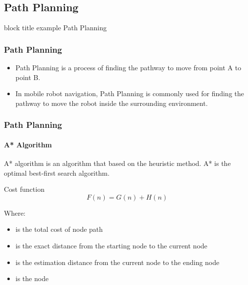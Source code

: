 \begin{frame}
	\subsection{Path Planning}
	\begin{beamercolorbox}[rounded=true]{block title example}
		\centering
		\LARGE
		Path Planning
	\end{beamercolorbox}
\end{frame}



\begin{frame}
	\frametitle{Path Planning}
	\begin{itemize}
		\item<1-> Path Planning is a process of finding the pathway to move from point A to point B.
		\item<2-> In mobile robot navigation, Path Planning is commonly used for finding the pathway to move the robot inside the surrounding environment.
	\end{itemize}
\end{frame}



\begin{frame}
	\frametitle{Path Planning}
	\framesubtitle{A* Algorithm}
	A* algorithm is an algorithm that based on the heuristic method. A* is the optimal best-first search algorithm.
	\begin{block}{Cost function}
		\begin{equation}
			F(n)=G(n)+H(n)
		\end{equation}
	\end{block}
	Where:
	\begin{itemize}
		\item { is the total cost of node path}
		\item { is the exact distance from the starting node to the current node}
		\item { is the estimation distance from the current node to the ending node}
		\item { is the node}
	\end{itemize}
\end{frame}



